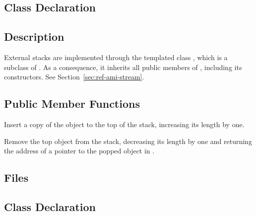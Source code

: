 \subsection{Class Declaration}
   \btabb
	 {}
   \etabb

\subsection{Description}
External stacks are implemented through the templated class
, 
which is a subclass of . As a consequence, it
inherits all public members of , including its
constructors. See Section~\ref{sec:ref-ami-stream}.

\subsection{Public Member Functions}
   \btabb 

       {Insert a copy of the
      object  to the top of the stack, increasing its length by
      one.}

        {Remove the top object from
       the stack, decreasing its length by one and returning the address of
       a pointer to the popped object in .}

   \etabb



\subsection{Files}
  \btabb
	 {}
  \etabb

\subsection{Class Declaration}
   \btabb

